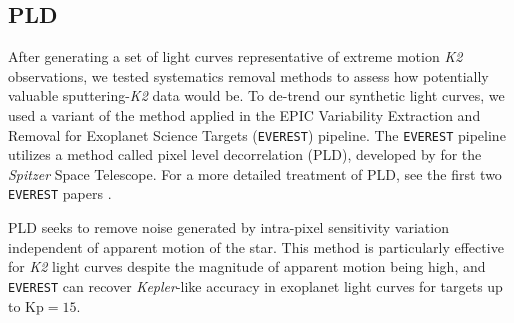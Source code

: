 \documentclass[12pt,preprint]{aastex}
\begin{document}
\subsection{PLD}

After generating a set of light curves representative of extreme motion \textit{K2} observations, we tested systematics removal methods to assess how potentially valuable sputtering-\textit{K2} data would be. To de-trend our synthetic light curves, we used a variant of the method applied in the EPIC Variability Extraction and Removal for Exoplanet Science Targets (\texttt{EVEREST}) pipeline. The \texttt{EVEREST} pipeline utilizes a method called pixel level decorrelation (PLD), developed by \cite{0004-637X-805-2-132} for the \textit{Spitzer} Space Telescope. For a more detailed treatment of PLD, see the first two \texttt{EVEREST} papers \citep{2016AJ....152..100L,2017arXiv170205488L}.

PLD seeks to remove noise generated by intra-pixel sensitivity variation independent of apparent motion of the star. This method is particularly effective for \textit{K2} light curves despite the magnitude of apparent motion being high, and \texttt{EVEREST} can recover \textit{Kepler}-like accuracy in exoplanet light curves for targets up to $\text{Kp} = 15$.
\end{document}
